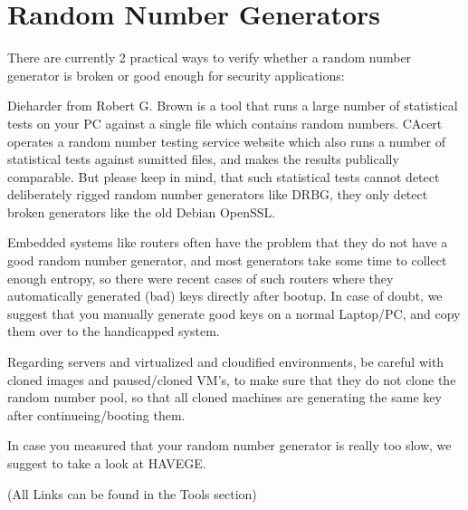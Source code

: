 \section{Random Number Generators}
\label{section:RNGs}

There are currently 2 practical ways to verify whether a random number generator is broken or good enough for security applications:

Dieharder from Robert G. Brown is a tool that runs a large number of statistical tests on your PC against a single file which contains random numbers.
CAcert operates a random number testing service website which also runs a number of statistical tests against sumitted files, and makes the results publically comparable.
But please keep in mind, that such statistical tests cannot detect deliberately rigged random number generators like DRBG, they only detect broken generators like the old Debian OpenSSL.


Embedded systems like routers often have the problem that they do not have a good random number generator, and most generators take some time to collect enough entropy, so there were recent cases of such routers where they automatically generated (bad) keys directly after bootup. In case of doubt, we suggest that you manually generate good keys on a normal Laptop/PC, and copy them over to the handicapped system.

Regarding servers and virtualized and cloudified environments, be careful with cloned images and paused/cloned VM's, to make sure that they do not clone the random number pool, so that all cloned machines are generating the same key after continueing/booting them.

In case you measured that your random number generator is really too slow, we suggest to take a look at HAVEGE.

(All Links can be found in the Tools section)
